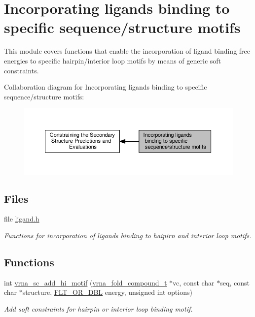 \hypertarget{group__ligands}{}\section{Incorporating ligands binding to specific sequence/structure motifs}
\label{group__ligands}


This module covers functions that enable the incorporation of ligand binding free energies to specific hairpin/interior loop motifs by means of generic soft constraints.  


Collaboration diagram for Incorporating ligands binding to specific sequence/structure motifs\+:
\nopagebreak
\begin{figure}[H]
\begin{center}
\leavevmode
\includegraphics[width=350pt]{group__ligands}
\end{center}
\end{figure}
\subsection*{Files}
\begin{DoxyCompactItemize}
\item 
file \hyperlink{ligand_8h}{ligand.\+h}
\begin{DoxyCompactList}\small\item\em Functions for incorporation of ligands binding to haipirn and interior loop motifs. \end{DoxyCompactList}\end{DoxyCompactItemize}
\subsection*{Functions}
\begin{DoxyCompactItemize}
\item 
int \hyperlink{group__ligands_gaa6ff0113a3a76dc0b8d62961f4e1dfa0}{vrna\+\_\+sc\+\_\+add\+\_\+hi\+\_\+motif} (\hyperlink{group__fold__compound_ga1b0cef17fd40466cef5968eaeeff6166}{vrna\+\_\+fold\+\_\+compound\+\_\+t} $\ast$vc, const char $\ast$seq, const char $\ast$structure, \hyperlink{group__data__structures_ga31125aeace516926bf7f251f759b6126}{F\+L\+T\+\_\+\+O\+R\+\_\+\+D\+BL} energy, unsigned int options)
\begin{DoxyCompactList}\small\item\em Add soft constraints for hairpin or interior loop binding motif. \end{DoxyCompactList}\end{DoxyCompactItemize}



